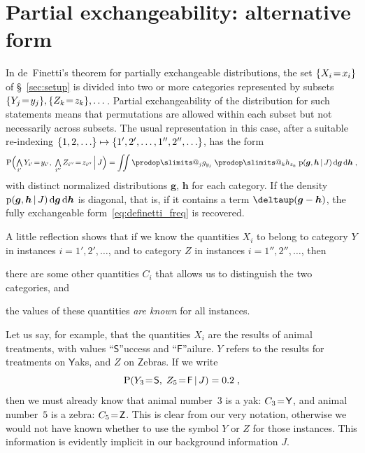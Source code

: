 \documentclass[\ifafour a4paper,12pt,\else a5paper,10pt,\fi%
onecolumn,oneside,article,%
british%
]{memoir}
\makeatletter
\theoremstyle{remark}
\theoremstyle{innote}
\def\prod{\DOTSI\prodop\slimits@}
\newcommand*{\delt}{\deltaup}%
\newcommand*{\di}{\mathrm{d}}%
\newcommand*{\Land}{\mathop{\textstyle\bigwedge}}
\DeclarePairedDelimiter\set{\{}{\}}
\newcommand*{\pf}{\mathrm{p}}%
\newcommand*{\p}{\mathrm{P}}%
\renewcommand*{\|}[1][]{\nonscript\,#1\vert\nonscript\,\mathopen{}}
\newcommand*{\sect}{\S}%
\renewcommand*{\=}{\TextOrMath\texteq\eq}
\newcommand*{\X}[1]{X_{#1}}
\newcommand*{\x}[1]{x_{#1}}
\newcommand*{\Y}[1]{Y_{#1}}
\newcommand*{\y}[1]{y_{#1}}
\newcommand*{\Z}[1]{Z_{#1}}
\newcommand*{\z}[1]{z_{#1}}
\newcommand*{\C}[1]{C_{#1}}
\newcommand*{\cc}[1]{c_{#1}}
\newcommand*{\bg}{\bm{g}}
\newcommand*{\bh}{\bm{h}}
\newcommand*{\xs}{\textsf{S}}
\newcommand*{\xf}{\textsf{F}}
\newcommand*{\xY}{\textsf{Y}}
\newcommand*{\xZ}{\textsf{Z}}
\newcommand*{\zI}{J}
\makeatother
\begin{document}
\section{Partial exchangeability: alternative form}
\label{sec:partial_exch}

In de~Finetti's theorem for partially exchangeable distributions, the set
$\set{\X{i}\=\x{i}}$ of \sect~\ref{sec:setup} is divided into two or more
categories represented by subsets
$\set{\Y{j}\=\y{j}}, \set{\Z{k}\=\z{k}}, \dotsc$. Partial exchangeability
of the distribution for such statements means that permutations are allowed
within each subset but not necessarily across subsets. The usual
representation in this case, after a suitable re-indexing
$\set{1,2,\dotsc} \mapsto \set{1', 2', \dotsc, 1'', 2'', \dotsc}$, has the
form
\begin{equation}
  \label{eq:partialdefinetti}
  \p\Bigl( \Land_{i'}\Y{i'}\=\y{i'},\;
  \Land_{i''}\Z{i''}\=\z{i''} \|[\Big] \zI\Bigr) =
  \iint
  \prod_{j} g_{\y{j}}\;
  \prod_{k} h_{\z{k}}\;
  \pf(\bg,\bh \| \zI)\,\di\bg\,\di\bh \;,
\end{equation}
with distinct normalized distributions $\bg$, $\bh$ for each category. If
the density $\pf(\bg,\bh \| \zI)\,\di\bg\,\di\bh$ is diagonal, that is, if
it contains a term $\delt(\bg-\bh)$, the fully exchangeable
form~\eqref{eq:definetti_freq} is recovered.



A little reflection shows that if we know the quantities $\X{i}$ to belong
to category $Y$ in instances $i=1',2',\dotsc$, and to category $Z$ in
instances $i=1'',2'',\dotsc$, then
\begin{enumerate*}[label=(\alph*)]
\item there are some other quantities $\C{i}$ that allows us to distinguish
  the two categories, and \item the values %
  of these quantities \emph{are known} for all instances.
\end{enumerate*}

Let us say, for example, that the quantities $\X{i}$ are the results of
animal treatments, with values \enquote{$\xs$}uccess and
\enquote{$\xf$}ailure. $Y$ refers to the results for treatments on
$\xY$aks, and $Z$ on $\xZ$ebras. If we write
$$\p(\Y{3}\=\xs,\;\Z{5}\=\xf \| \zI)=0.2\;,$$
then we must already know that animal number~$3$ is a yak: $\C{3}\=\xY$,
and animal number~$5$ is a zebra: $\C{5}\=\xZ$. This is clear from our very
notation, otherwise we would not have known whether to use the symbol $Y$
or $Z$ for those instances. This information is evidently implicit in our
background information $\zI$.
\end{document}
